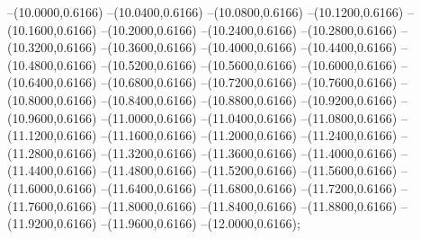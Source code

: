 {	--(10.0000,0.6166)
	--(10.0400,0.6166)
	--(10.0800,0.6166)
	--(10.1200,0.6166)
	--(10.1600,0.6166)
	--(10.2000,0.6166)
	--(10.2400,0.6166)
	--(10.2800,0.6166)
	--(10.3200,0.6166)
	--(10.3600,0.6166)
	--(10.4000,0.6166)
	--(10.4400,0.6166)
	--(10.4800,0.6166)
	--(10.5200,0.6166)
	--(10.5600,0.6166)
	--(10.6000,0.6166)
	--(10.6400,0.6166)
	--(10.6800,0.6166)
	--(10.7200,0.6166)
	--(10.7600,0.6166)
	--(10.8000,0.6166)
	--(10.8400,0.6166)
	--(10.8800,0.6166)
	--(10.9200,0.6166)
	--(10.9600,0.6166)
	--(11.0000,0.6166)
	--(11.0400,0.6166)
	--(11.0800,0.6166)
	--(11.1200,0.6166)
	--(11.1600,0.6166)
	--(11.2000,0.6166)
	--(11.2400,0.6166)
	--(11.2800,0.6166)
	--(11.3200,0.6166)
	--(11.3600,0.6166)
	--(11.4000,0.6166)
	--(11.4400,0.6166)
	--(11.4800,0.6166)
	--(11.5200,0.6166)
	--(11.5600,0.6166)
	--(11.6000,0.6166)
	--(11.6400,0.6166)
	--(11.6800,0.6166)
	--(11.7200,0.6166)
	--(11.7600,0.6166)
	--(11.8000,0.6166)
	--(11.8400,0.6166)
	--(11.8800,0.6166)
	--(11.9200,0.6166)
	--(11.9600,0.6166)
	--(12.0000,0.6166);
}
